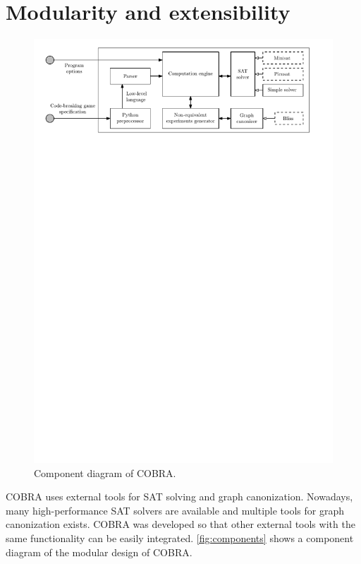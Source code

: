 \section{Modularity and extensibility}

\begin{figure}[ht]
\includegraphics[width=\textwidth]{pictures/modularity.pdf}
\caption{Component diagram of COBRA.}
\label{fig:components}
\end{figure}


COBRA uses external tools for SAT solving and graph canonization.
Nowadays, many high-performance SAT solvers are available
  and multiple tools for graph canonization exists.
COBRA was developed so that other external tools with the same functionality
  can be easily integrated.
\autoref{fig:components} shows a component diagram of
  the modular design of COBRA.


